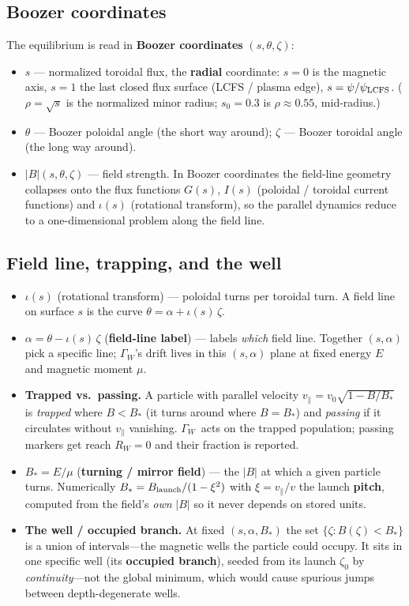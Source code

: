 \documentclass[11pt]{article}
\newcommand{\GW}{\ensuremath{\Gamma_W}}
\newcommand{\Bstar}{\ensuremath{B_\ast}}
\newcommand{\ii}{\ensuremath{\iota}}
\begin{document}
\subsection{Boozer coordinates}
The equilibrium is read in \textbf{Boozer coordinates} $(s,\theta,\zeta)$:
\begin{itemize}[nosep]
  \item $s$ --- normalized toroidal flux, the \textbf{radial} coordinate: $s=0$ is the magnetic
        axis, $s=1$ the last closed flux surface (LCFS / plasma edge), $s=\psi/\psi_{\rm LCFS}$.
        ($\rho=\sqrt{s}$ is the normalized minor radius; $s_0=0.3$ is $\rho\approx0.55$, mid-radius.)
  \item $\theta$ --- Boozer poloidal angle (the short way around); $\zeta$ --- Boozer toroidal
        angle (the long way around).
  \item $|B|(s,\theta,\zeta)$ --- field strength. In Boozer coordinates the field-line geometry
        collapses onto the flux functions $G(s)$, $I(s)$ (poloidal / toroidal current functions)
        and $\ii(s)$ (rotational transform), so the parallel dynamics reduce to a one-dimensional
        problem along the field line.
\end{itemize}

\subsection{Field line, trapping, and the well}
\begin{itemize}[nosep]
  \item $\ii(s)$ (rotational transform) --- poloidal turns per toroidal turn. A field line on
        surface $s$ is the curve $\theta=\alpha+\ii(s)\,\zeta$.
  \item $\alpha=\theta-\ii(s)\,\zeta$ (\textbf{field-line label}) --- labels \emph{which} field
        line. Together $(s,\alpha)$ pick a specific line; \GW's drift lives in this $(s,\alpha)$
        plane at fixed energy $E$ and magnetic moment $\mu$.
  \item \textbf{Trapped vs.\ passing.} A particle with parallel velocity
        $v_\parallel=v_0\sqrt{1-B/\Bstar}$ is \emph{trapped} where $B<\Bstar$ (it turns around
        where $B=\Bstar$) and \emph{passing} if it circulates without $v_\parallel$ vanishing.
        \GW\ acts on the trapped population; passing markers get reach $R_W=0$ and their
        fraction is reported.
  \item $\Bstar=E/\mu$ (\textbf{turning / mirror field}) --- the $|B|$ at which a given particle
        turns. Numerically $\Bstar=B_{\rm launch}/(1-\xi^2)$ with $\xi=v_\parallel/v$ the launch
        \textbf{pitch}, computed from the field's \emph{own} $|B|$ so it never depends on stored
        units.
  \item \textbf{The well / occupied branch.} At fixed $(s,\alpha,\Bstar)$ the set
        $\{\zeta:B(\zeta)<\Bstar\}$ is a union of intervals---the magnetic wells the particle
        could occupy. It sits in one specific well (its \textbf{occupied branch}), seeded from
        its launch $\zeta_0$ by \emph{continuity}---not the global minimum, which would cause
        spurious jumps between depth-degenerate wells.
\end{itemize}
\end{document}
